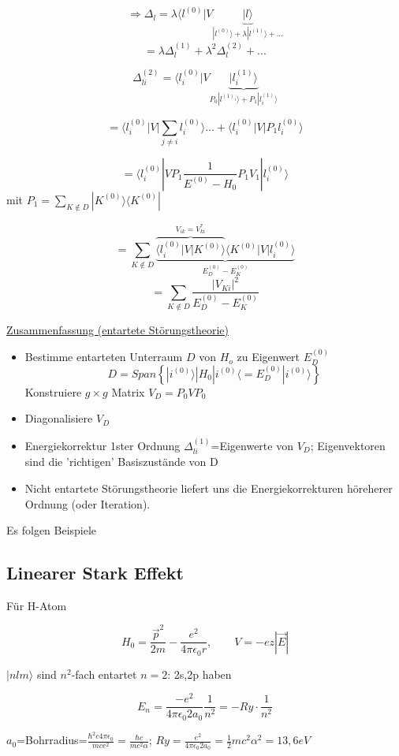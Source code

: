 \[ \Rightarrow \Delta_l = \lambda \langle l^{(0)}| V \underbrace{|l\rangle}_{|l^{(0)}\rangle+\lambda|l^{(1)}\rangle+...}\]
\[ =\lambda \Delta^{(1)}_l+\lambda^2\Delta^{(2)}_l+...\]


\[  \Delta^{(2)}_{li} = \langle l^{(0)}_i| V \underbrace{|l^{(1)}_i\rangle}_{P_0|l^{(1)_i}\rangle+P_1|l^{(1)}_i\rangle}\]

\[ = \langle l^{(0)}_i| V |\sum_{j\neq i}l^{(0)}_i\rangle ...+\langle l^{(0)}_i|  V |P_1 l^{(0)}_i\rangle\]

\[ = \langle l^{(0)}_i| V P_1 \frac{1}{E^{(0)}-H_0} P_1V_1|l^{(0)}_i\rangle\]
mit \(P_1 = \sum_{K\notin D}|K^{(0)}\rangle\langle K^{(0)}|\)

\[ =  \sum_{K\notin D}\underbrace{\overbrace{\langle l^{(0)}_i| V | K^{(0)}\rangle}^{V_{ik}=V^*_{ki}}\langle K^{(0)}| V | l^{(0)}_i\rangle}_{E^{(0)}_D-E^{(0)}_K}\]
\[ =  \sum_{K\notin D} \frac{|V_{Ki}|^2}{E^{(0)}_D-E^{(0)}_K}\]


\underline{Zusammenfassung (entartete Störungstheorie)}


\begin{itemize}
\item Bestimme entarteten Unterraum \(D\) von \(H_o\) zu Eigenwert \(E^{(0)}_D\)
\[ D = Span\left\{ |i^{(0)}\rangle | H_0|i^{(0)}\langle = E^{(0)}_D |i^{(0)}\rangle \right\}\]
Konstruiere \(g\times g\) Matrix \(V_D = P_0VP_0\)
\item Diagonalisiere \(V_D\)
\item Energiekorrektur 1ster Ordnung \(\Delta^{(1)}_{li}\)=Eigenwerte von \(V_D\); Eigenvektoren sind die 'richtigen' Basiszustände von D
\item Nicht entartete Störungstheorie liefert uns die Energiekorrekturen höreherer Ordnung (oder Iteration).
\end{itemize}

Es folgen Beispiele
\subsection{Linearer Stark Effekt}
Für H-Atom

\[ H_0 = \frac{\vec p^2}{2m}-\frac{e^2}{4\pi\epsilon_0 r}, \qquad V=-ez|\vec E|\]

\(|nlm\rangle\) sind \(n^2\)-fach entartet \(n=2\): 2s,2p haben

\[ E_n = \frac{-e^2}{4\pi\epsilon_0 2a_0}\frac{1}{n^2}=-Ry\cdot \frac{1}{n^2}\]

\(a_0\)=Bohrradius=\(\frac{\hbar^2 c4\pi\epsilon_0}{mce^2}= \frac{\hbar c}{mc^2\alpha}\); \(Ry = \frac{e^2}{4\pi\epsilon_0 2a_0}=\frac{1}{2}mc^2 \alpha^2 = 13,6 eV\)


